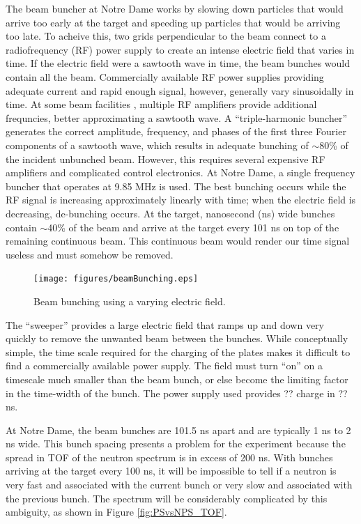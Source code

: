 The beam buncher at Notre Dame works by slowing down particles that would arrive too early at the target and speeding up particles that would be arriving too late.  To acheive this, two grids perpendicular to the beam connect to a radiofrequency (RF) power supply to create an intense electric field that varies in time.  If the electric field were a sawtooth wave in time, the beam bunches would contain all the beam.  Commercially available RF power supplies providing adequate current and rapid enough signal, however, generally vary sinusoidally in time.  At some beam facilities \cite{LynchBunching}, multiple RF amplifiers provide additional frequncies, better approximating a sawtooth wave.  A ``triple-harmonic buncher'' \cite{LynchBunching} generates the correct amplitude, frequency, and phases of the first three Fourier components of a sawtooth wave, which results in adequate bunching of $\sim$80\% of the incident unbunched beam.  However, this requires several expensive RF amplifiers and complicated control electronics.  At Notre Dame, a single frequency buncher that operates at 9.85 MHz is used.  The best bunching occurs while the RF signal is increasing approximately linearly with time; when the electric field is decreasing, de-bunching occurs.  At the target, nanosecond (ns) wide bunches contain $\sim$40\% of the beam and arrive at the target every 101 ns on top of the remaining continuous beam.  This continuous beam would render our time signal useless and must somehow be removed.

\begin{figure}[htp]
\centering
\texttt{[image: figures/beamBunching.eps]}
\label{fig:bunching}
\caption{Beam bunching using a varying electric field.}
\end{figure}

The ``sweeper'' provides a large electric field that ramps up and down very quickly to remove the unwanted beam between the bunches.  While conceptually simple, the time scale required for the charging of the plates makes it difficult to find a commercially available power supply.  The field must turn ``on'' on a timescale much smaller than the beam bunch, or else become the limiting factor in the time-width of the bunch.  The power supply used provides ?? charge in ?? ns.


At Notre Dame, the beam bunches are 101.5 ns apart and are typically 1 ns to 2 ns wide.  This bunch spacing presents a problem for the experiment because the spread in TOF of the neutron spectrum is in excess of 200 ns.  With bunches arriving at the target every 100 ns, it will be impossible to tell if a neutron is very fast and associated with the current bunch or very slow and associated with the previous bunch.  The spectrum will be considerably complicated by this ambiguity, as shown in Figure \ref{fig:PSvsNPS_TOF}.

